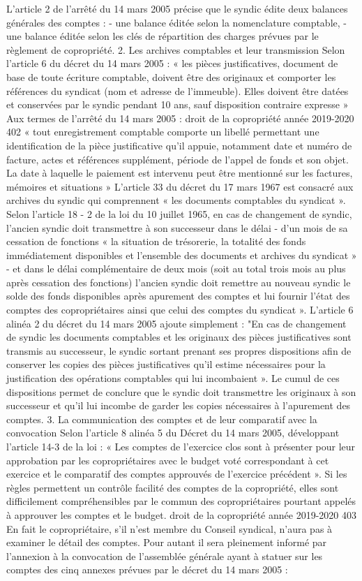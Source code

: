 L'article 2 de l'arrêté du 14 mars 2005 précise que le syndic édite deux balances générales des comptes :
- une balance éditée selon la nomenclature comptable,
- une balance éditée selon les clés de répartition des charges prévues par le règlement de copropriété.
2. Les archives comptables et leur transmission
Selon l’article 6 du décret du 14 mars 2005 :
« les pièces justificatives, document de base de toute écriture comptable, doivent être des originaux et comporter les références du syndicat (nom et adresse de l'immeuble). Elles doivent être datées et conservées par le syndic pendant 10 ans, sauf disposition contraire expresse »
Aux termes de l'arrêté du 14 mars 2005 :
droit de la copropriété année 2019-2020
402
« tout enregistrement comptable comporte un libellé permettant une identification de la pièce justificative qu'il appuie, notamment date et numéro de facture, actes et références supplément, période de l'appel de fonds et son objet.
La date à laquelle le paiement est intervenu peut être mentionné sur les factures, mémoires et situations »
L'article 33 du décret du 17 mars 1967 est consacré aux archives du syndic qui comprennent « les documents comptables du syndicat ».
Selon l'article 18 - 2 de la loi du 10 juillet 1965, en cas de changement de syndic, l’ancien syndic doit transmettre à son successeur dans le délai
- d'un mois de sa cessation de fonctions « la situation de trésorerie, la totalité des fonds immédiatement disponibles et l'ensemble des documents et archives du syndicat »
- et dans le délai complémentaire de deux mois (soit au total trois mois au plus après cessation des fonctions) l'ancien syndic doit remettre au nouveau syndic le solde des fonds disponibles après apurement des comptes et lui fournir l’état des comptes des copropriétaires ainsi que celui des comptes du syndicat ».
L'article 6 alinéa 2 du décret du 14 mars 2005 ajoute simplement :
"En cas de changement de syndic les documents comptables et les originaux des pièces justificatives sont transmis au successeur, le syndic sortant prenant ses propres dispositions afin de conserver les copies des pièces justificatives qu'il estime nécessaires pour la justification des opérations comptables qui lui incombaient ».
Le cumul de ces dispositions permet de conclure que le syndic doit transmettre les originaux à son successeur et qu'il lui incombe de garder les copies nécessaires à l'apurement des comptes.
3. La communication des comptes et de leur comparatif avec la convocation
Selon l’article 8 alinéa 5 du Décret du 14 mars 2005, développant l’article 14-3 de la loi :
« Les comptes de l’exercice clos sont à présenter pour leur approbation par les copropriétaires avec le budget voté correspondant à cet exercice et le comparatif des comptes approuvés de l’exercice précédent ».
Si les règles permettent un contrôle facilité des comptes de la copropriété, elles sont difficilement compréhensibles par le commun des copropriétaires pourtant appelés à approuver les comptes et le budget.
droit de la copropriété année 2019-2020
403
En fait le copropriétaire, s’il n’est membre du Conseil syndical, n’aura pas à examiner le détail des comptes. Pour autant il sera pleinement informé par l’annexion à la convocation de l'assemblée générale ayant à statuer sur les comptes des cinq annexes prévues par le décret du 14 mars 2005 :